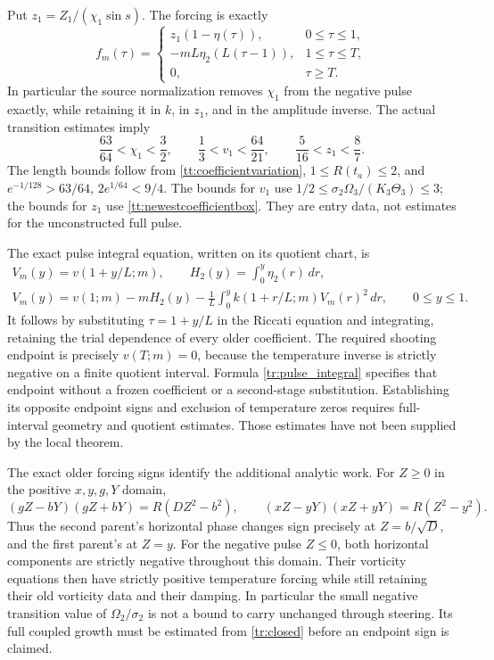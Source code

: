 Put $z_1=Z_1/(\chi_1\sin s)$. The forcing is exactly
\begin{equation}\label{tr:forcing}
 f_m(\tau)=
 \begin{cases}
 z_1(1-\eta(\tau)),&0\leq\tau\leq1,\\
 -mL\eta_2(L(\tau-1)),&1\leq\tau\leq T,\\
 0,&\tau\geq T.
 \end{cases}
\end{equation}
In particular the source normalization removes $\chi_1$ from the
negative pulse exactly, while retaining it in $k$, in $z_1$, and in
the amplitude inverse. The actual transition estimates imply
\[
 \frac{63}{64}<\chi_1<\frac32,\qquad
 \frac13<v_1<\frac{64}{21},\qquad
 \frac5{16}<z_1<\frac87.
\]
The length bounds follow from \eqref{tt:coefficientvariation},
$1\leq R(t_a)\leq2$, and
$e^{-1/128}>63/64$, $2e^{1/64}<9/4$.
The bounds for $v_1$ use $1/2\leq\sigma_2\Omega_3/(K_3\Theta_3)\leq3$;
the bounds for $z_1$ use \eqref{tt:newestcoefficientbox}.
They are entry data, not estimates for the unconstructed full pulse.

The exact pulse integral equation, written on its quotient chart,
is
\begin{equation}\label{tr:pulse_integral}
 \begin{gathered}
 V_m(y)=v(1+y/L;m),\qquad
 H_2(y)=\int_0^y\eta_2(r)\,dr,\\
 V_m(y)=v(1;m)-mH_2(y)
       -\frac1L\int_0^y k(1+r/L;m)V_m(r)^2\,dr,
 \qquad 0\leq y\leq1.
 \end{gathered}
\end{equation}
It follows by substituting $\tau=1+y/L$ in the Riccati equation
and integrating, retaining the trial dependence of every older
coefficient. The required shooting endpoint is precisely $v(T;m)=0$,
because the temperature inverse is strictly negative on a finite
quotient interval. Formula \eqref{tr:pulse_integral} specifies that
endpoint without a frozen coefficient or a second-stage substitution.
Establishing its opposite endpoint signs and exclusion of temperature
zeros requires full-interval geometry and quotient estimates.
Those estimates have not been supplied by the local theorem.

The exact older forcing signs identify the additional analytic work.
For $Z\geq0$ in the positive $x,y,g,Y$ domain,
\[
 (gZ-bY)(gZ+bY)=R(DZ^2-b^2),\qquad
 (xZ-yY)(xZ+yY)=R(Z^2-y^2).
\]
Thus the second parent's horizontal phase changes sign precisely at
$Z=b/\sqrt D$, and the first parent's at $Z=y$.
For the negative pulse $Z\leq0$, both horizontal components are
strictly negative throughout this domain. Their vorticity equations
then have strictly positive temperature forcing while still retaining
their old vorticity data and their damping. In particular the small
negative transition value of $\Omega_2/\sigma_2$ is not a bound
to carry unchanged through steering. Its full coupled growth must be
estimated from \eqref{tr:closed} before an endpoint sign is claimed.

